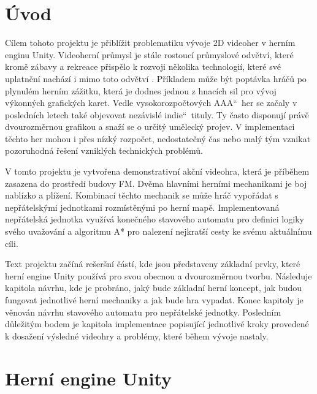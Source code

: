 \documentclass[FM,Proj,bw]{tulthesis}
\begin{document}
	\chapter{Úvod}
	
	Cílem tohoto projektu je přiblížit problematiku vývoje 2D videoher v herním enginu Unity. Videoherní průmysl je stále rostoucí průmyslové odvětví, které kromě zábavy a rekreace přispělo k rozvoji několika technologií, které své uplatnění nachází i mimo toto odvětví \cite{VideoGames}. Příkladem může být poptávka hráčů po plynulém herním zážitku, která je dodnes jednou z hnacích sil pro vývoj výkonných grafických karet. Vedle vysokorozpočtových \quotedblbase AAA\textquotedblleft\ her se začaly v posledních letech také objevovat nezávislé \quotedblbase indie\textquotedblleft\ tituly. Ty často disponují právě dvourozměrnou grafikou a snaží se o určitý umělecký projev. V implementaci těchto her mohou i přes nízký rozpočet, nedostatečný čas nebo malý tým vznikat pozoruhodná řešení vzniklých technických problémů.
	
	V tomto projektu je vytvořena demonstrativní akční videohra, která je příběhem zasazena do prostředí budovy FM. Dvěma hlavními herními mechanikami je boj nablízko a plížení. Kombinací těchto mechanik se může hráč vypořádat s nepřátelskými jednotkami rozmístěnými po herní mapě. Implementovaná nepřátelská jednotka využívá konečného stavového automatu pro definici logiky svého uvažování a algoritmu A* pro nalezení nejkratší cesty ke svému aktuálnímu cíli.
	
	Text projektu začíná rešeršní částí, kde jsou představeny základní prvky, které herní engine Unity používá pro svou obecnou a  dvourozměrnou tvorbu. Následuje kapitola návrhu, kde je probráno, jaký bude základní herní koncept, jak budou fungovat jednotlivé herní mechaniky a jak bude hra vypadat. Konec kapitoly je věnován návrhu stavového automatu pro nepřátelské jednotky. Posledním důležitým bodem je kapitola implementace popisující jednotlivé kroky provedené k dosažení výsledné videohry a problémy, které během vývoje nastaly.
	
	\chapter{Herní engine Unity}
	\label{chp2}
	
\end{document}
